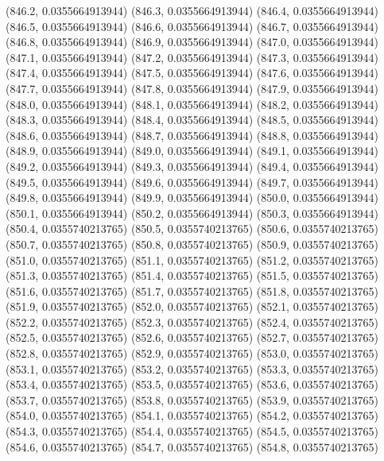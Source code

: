 {					(846.2, 0.0355664913944)
					(846.3, 0.0355664913944)
					(846.4, 0.0355664913944)
					(846.5, 0.0355664913944)
					(846.6, 0.0355664913944)
					(846.7, 0.0355664913944)
					(846.8, 0.0355664913944)
					(846.9, 0.0355664913944)
					(847.0, 0.0355664913944)
					(847.1, 0.0355664913944)
					(847.2, 0.0355664913944)
					(847.3, 0.0355664913944)
					(847.4, 0.0355664913944)
					(847.5, 0.0355664913944)
					(847.6, 0.0355664913944)
					(847.7, 0.0355664913944)
					(847.8, 0.0355664913944)
					(847.9, 0.0355664913944)
					(848.0, 0.0355664913944)
					(848.1, 0.0355664913944)
					(848.2, 0.0355664913944)
					(848.3, 0.0355664913944)
					(848.4, 0.0355664913944)
					(848.5, 0.0355664913944)
					(848.6, 0.0355664913944)
					(848.7, 0.0355664913944)
					(848.8, 0.0355664913944)
					(848.9, 0.0355664913944)
					(849.0, 0.0355664913944)
					(849.1, 0.0355664913944)
					(849.2, 0.0355664913944)
					(849.3, 0.0355664913944)
					(849.4, 0.0355664913944)
					(849.5, 0.0355664913944)
					(849.6, 0.0355664913944)
					(849.7, 0.0355664913944)
					(849.8, 0.0355664913944)
					(849.9, 0.0355664913944)
					(850.0, 0.0355664913944)
					(850.1, 0.0355664913944)
					(850.2, 0.0355664913944)
					(850.3, 0.0355664913944)
					(850.4, 0.0355740213765)
					(850.5, 0.0355740213765)
					(850.6, 0.0355740213765)
					(850.7, 0.0355740213765)
					(850.8, 0.0355740213765)
					(850.9, 0.0355740213765)
					(851.0, 0.0355740213765)
					(851.1, 0.0355740213765)
					(851.2, 0.0355740213765)
					(851.3, 0.0355740213765)
					(851.4, 0.0355740213765)
					(851.5, 0.0355740213765)
					(851.6, 0.0355740213765)
					(851.7, 0.0355740213765)
					(851.8, 0.0355740213765)
					(851.9, 0.0355740213765)
					(852.0, 0.0355740213765)
					(852.1, 0.0355740213765)
					(852.2, 0.0355740213765)
					(852.3, 0.0355740213765)
					(852.4, 0.0355740213765)
					(852.5, 0.0355740213765)
					(852.6, 0.0355740213765)
					(852.7, 0.0355740213765)
					(852.8, 0.0355740213765)
					(852.9, 0.0355740213765)
					(853.0, 0.0355740213765)
					(853.1, 0.0355740213765)
					(853.2, 0.0355740213765)
					(853.3, 0.0355740213765)
					(853.4, 0.0355740213765)
					(853.5, 0.0355740213765)
					(853.6, 0.0355740213765)
					(853.7, 0.0355740213765)
					(853.8, 0.0355740213765)
					(853.9, 0.0355740213765)
					(854.0, 0.0355740213765)
					(854.1, 0.0355740213765)
					(854.2, 0.0355740213765)
					(854.3, 0.0355740213765)
					(854.4, 0.0355740213765)
					(854.5, 0.0355740213765)
					(854.6, 0.0355740213765)
					(854.7, 0.0355740213765)
					(854.8, 0.0355740213765)
}

